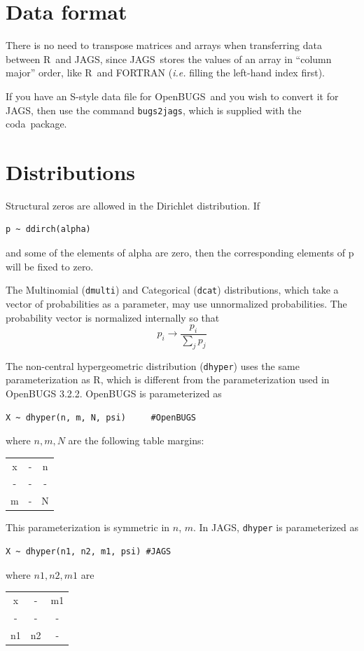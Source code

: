 \documentclass[11pt, a4paper, titlepage]{report}
\newcommand{\JAGS}{\textsf{JAGS}}
\newcommand{\OpenBUGS}{\textsf{OpenBUGS}}
\newcommand{\R}{\textsf{R}}
\newcommand{\CODA}{\textsf{coda}}
\begin{document}
\section{Data format}

There is no need to transpose matrices and arrays when transferring
data between \R\ and \JAGS, since \JAGS\ stores the values of an array
in ``column major'' order, like \R\ and FORTRAN ({\em i.e.} filling
the left-hand index first).

If you have an \textsf{S}-style data file for \OpenBUGS\ and you wish
to convert it for \JAGS, then use the command \texttt{bugs2jags},
which is supplied with the \CODA\ package.

\section{Distributions}

Structural zeros are allowed in the Dirichlet distribution. If
\begin{verbatim}
p ~ ddirch(alpha)
\end{verbatim}
and some of the elements of alpha are zero, then the corresponding
elements of p will be fixed to zero.

The Multinomial (\verb+dmulti+) and Categorical (\verb+dcat+)
distributions, which take a vector of probabilities as a parameter,
may use unnormalized probabilities. The probability vector is
normalized internally so that
\[
p_i \rightarrow \frac{p_i}{\sum_j p_j}
\]

The non-central hypergeometric distribution (\verb+dhyper+) uses the
same parameterization as R, which is different from the
parameterization used in OpenBUGS 3.2.2. OpenBUGS is parameterized as
\begin{verbatim}
X ~ dhyper(n, m, N, psi)     #OpenBUGS
\end{verbatim}
where $n, m, N$ are the following table margins:
\begin{center}
\begin{tabular}{|cc|c|}
\hline
x & - & n \\
-  & - & -  \\
\hline
m & - & N \\
\hline
\end{tabular}
\end{center}
This parameterization is symmetric in $n$, $m$. In JAGS, \verb+dhyper+
is parameterized as
\begin{verbatim}
X ~ dhyper(n1, n2, m1, psi) #JAGS 
\end{verbatim}
where $n1, n2, m1$ are
\begin{center}
\begin{tabular}{|cc|c|}
\hline
x & - & m1 \\
-  & - & -   \\
\hline
n1 & n2 & - \\
\hline
\end{tabular}
\end{center}
\end{document}

